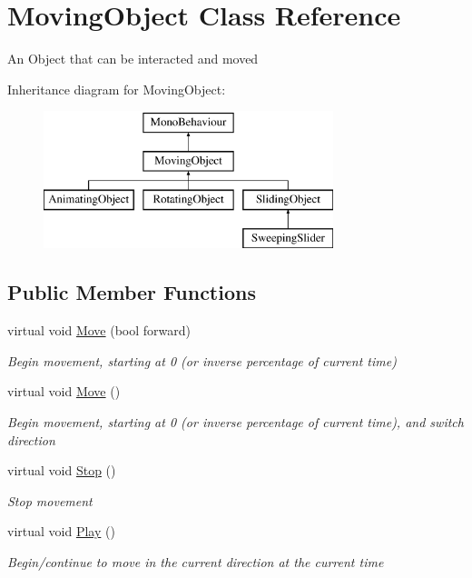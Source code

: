 \hypertarget{class_moving_object}{}\section{Moving\+Object Class Reference}
\label{class_moving_object}


An Object that can be interacted and moved  


Inheritance diagram for Moving\+Object\+:\begin{figure}[H]
\begin{center}
\leavevmode
\includegraphics[height=4.000000cm]{class_moving_object}
\end{center}
\end{figure}
\subsection*{Public Member Functions}
\begin{DoxyCompactItemize}
\item 
virtual void \mbox{\hyperlink{class_moving_object_a13f0299fb3749abeb0eb0ed4fd583036}{Move}} (bool forward)
\begin{DoxyCompactList}\small\item\em Begin movement, starting at 0 (or inverse percentage of current time) \end{DoxyCompactList}\item 
virtual void \mbox{\hyperlink{class_moving_object_aebfe91fa850bfb3daecb1475f14fdbb0}{Move}} ()
\begin{DoxyCompactList}\small\item\em Begin movement, starting at 0 (or inverse percentage of current time), and switch direction \end{DoxyCompactList}\item 
virtual void \mbox{\hyperlink{class_moving_object_a6c96ef69cae2a5820addbe6d09e3a7d6}{Stop}} ()
\begin{DoxyCompactList}\small\item\em Stop movement \end{DoxyCompactList}\item 
virtual void \mbox{\hyperlink{class_moving_object_ad6bfc4de0d0a787cc7ee22f592f8969f}{Play}} ()
\begin{DoxyCompactList}\small\item\em Begin/continue to move in the current direction at the current time \end{DoxyCompactList}\end{DoxyCompactItemize}
